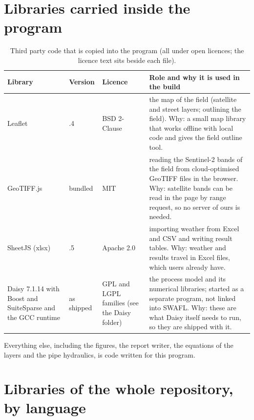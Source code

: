 \section{Libraries carried inside the program}
\begin{table}[H]\centering\small
\caption{Third party code that is copied into the program (all under open licences; the licence text sits beside each file).}\label{tab:libs}
\begin{tabular}{@{}>{\raggedright\arraybackslash}p{3.0cm}>{\raggedright\arraybackslash}p{1.9cm}>{\raggedright\arraybackslash}p{2.6cm}>{\raggedright\arraybackslash}p{5.5cm}@{}}
\toprule Library & Version & Licence & Role and why it is used in the build\\\midrule
Leaflet & 1.9.4 & BSD 2-Clause & the map of the field (satellite and street layers; outlining the field). Why: a small map library that works offline with local code and gives the field outline tool.\\
GeoTIFF.js & bundled & MIT & reading the Sentinel-2 bands of the field from cloud-optimised GeoTIFF files in the browser. Why: satellite bands can be read in the page by range request, so no server of ours is needed.\\
SheetJS (xlsx) & 0.18.5 & Apache 2.0 & importing weather from Excel and CSV and writing result tables. Why: weather and results travel in Excel files, which users already have.\\
Daisy 7.1.14 with Boost and SuiteSparse and the GCC runtime & as shipped & GPL and LGPL families (see the Daisy folder) & the process model and its numerical libraries; started as a separate program, not linked into SWAFL. Why: these are what Daisy itself needs to run, so they are shipped with it.\\
\bottomrule\end{tabular}\end{table}
Everything else, including the figures, the report writer, the equations of the layers and the pipe hydraulics, is code written for this program.

\section{Libraries of the whole repository, by language}
